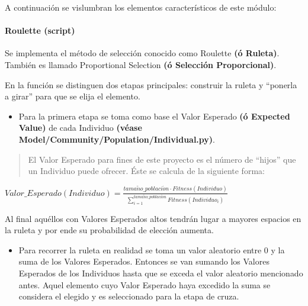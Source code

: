 \documentclass[letterpaper,10pt,english]{sphinxmanual}
\begin{document}
A continuación se vislumbran los elementos característicos de este módulo:


\paragraph{Roulette (script)}
\label{Model/Operator/Selection/Roulette::doc}\label{Model/Operator/Selection/Roulette:roulette-script}
\begin{DUlineblock}{0em}
\item[] Se implementa el método de selección conocido como Roulette \textbf{(ó Ruleta)}. También es llamado
Proportional Selection \textbf{(ó Selección Proporcional)}.
\item[] En la función se distinguen dos etapas principales: construir la ruleta y ``ponerla a girar'' para que se elija el elemento.
\end{DUlineblock}
\begin{itemize}
\item {} 
Para la primera etapa se toma como base el Valor Esperado \textbf{(ó Expected Value)} de cada Individuo \textbf{(véase Model/Community/Population/Individual.py)}.

\end{itemize}
\begin{quote}

El Valor Esperado para fines de este proyecto es el número de ``hijos'' que un Individuo puede ofrecer. Éste se calcula de la siguiente forma:
\end{quote}

\begin{center}\(Valor\_Esperado(Individuo) = \frac{tama\tilde{n}o\_poblaci\acute{o}n \cdot Fitness(Individuo)}{\sum_{i=1}^{tama\tilde{n}o\_poblaci\acute{o}n}Fitness(Individuo_i)}\)
\end{center}
\begin{DUlineblock}{0em}
\item[] Al final aquéllos con Valores Esperados altos tendrán lugar a mayores espacios en la ruleta y por ende su probabilidad de elección aumenta.
\end{DUlineblock}
\begin{itemize}
\item {} 
Para recorrer la ruleta en realidad se toma un valor aleatorio entre 0 y la suma de los Valores Esperados. Entonces se van sumando los Valores Esperados de los Individuos hasta que se exceda el valor aleatorio mencionado antes. Aquel elemento cuyo Valor Esperado haya excedido la suma se considera el elegido y es seleccionado para la etapa de cruza.

\end{itemize}
\end{document}
